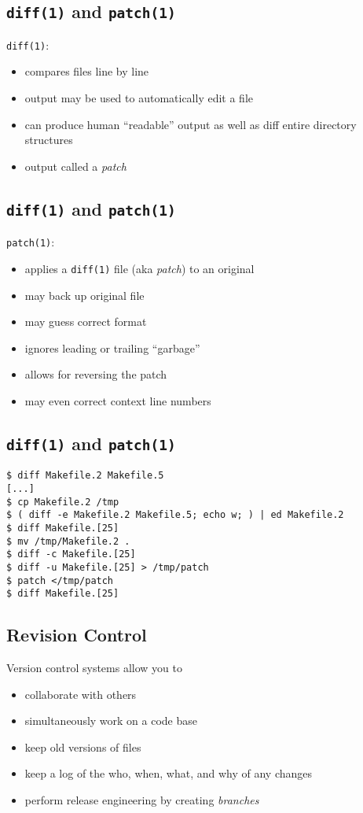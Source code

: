 \documentclass[xga]{xdvislides}
\begin{document}
\subsection{{\tt diff(1)} and {\tt patch(1)}}
{\tt diff(1)}:
\begin{itemize}
	\item compares files line by line
	\item output may be used to automatically edit a file
	\item can produce human ``readable'' output as well as diff entire
		directory structures
	\item output called a {\em patch}
\end{itemize}

\subsection{{\tt diff(1)} and {\tt patch(1)}}
{\tt patch(1)}:
\begin{itemize}
	\item applies a {\tt diff(1)} file (aka {\em patch}) to an original
	\item may back up original file
	\item may guess correct format
	\item ignores leading or trailing ``garbage''
	\item allows for reversing the patch
	\item may even correct context line numbers
\end{itemize}

\subsection{{\tt diff(1)} and {\tt patch(1)}}
\begin{verbatim}
$ diff Makefile.2 Makefile.5
[...]
$ cp Makefile.2 /tmp
$ ( diff -e Makefile.2 Makefile.5; echo w; ) | ed Makefile.2
$ diff Makefile.[25]
$ mv /tmp/Makefile.2 .
$ diff -c Makefile.[25]
$ diff -u Makefile.[25] > /tmp/patch
$ patch </tmp/patch
$ diff Makefile.[25]
\end{verbatim}

\subsection{Revision Control}
Version control systems allow you to

\begin{itemize}
	\item collaborate with others
	\item simultaneously work on a code base
	\item keep old versions of files
	\item keep a log of the who, when, what, and why of any changes
	\item perform release engineering by creating {\em branches}
\end{itemize}
\end{document}
